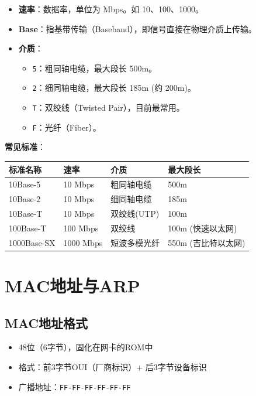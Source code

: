 \begin{itemize}[leftmargin=2em,itemsep=0pt]
    \item \textbf{速率}：数据率，单位为 Mbps。如 10、100、1000。
    \item \textbf{Base}：指基带传输（Baseband），即信号直接在物理介质上传输。
    \item \textbf{介质}：
    \begin{itemize}[itemsep=0pt]
        \item \texttt{5}：粗同轴电缆，最大段长 500m。
        \item \texttt{2}：细同轴电缆，最大段长 185m (约 200m)。
        \item \texttt{T}：双绞线（Twisted Pair），目前最常用。
        \item \texttt{F}：光纤（Fiber）。
    \end{itemize}
\end{itemize}

\textbf{常见标准}：
\begin{table}[htbp]
\centering\small
\begin{tabular}{llll}
\toprule
\textbf{标准名称} & \textbf{速率} & \textbf{介质} & \textbf{最大段长} \\
\midrule
10Base-5 & 10 Mbps & 粗同轴电缆 & 500m \\
10Base-2 & 10 Mbps & 细同轴电缆 & 185m \\
10Base-T & 10 Mbps & 双绞线(UTP) & 100m \\
100Base-T & 100 Mbps & 双绞线 & 100m (快速以太网) \\
1000Base-SX & 1000 Mbps & 短波多模光纤 & 550m (吉比特以太网) \\
\bottomrule
\end{tabular}
\end{table}

\section{MAC地址与ARP}
\subsection{MAC地址格式}
\begin{itemize}[leftmargin=2em,itemsep=0pt]
    \item 48位（6字节），固化在网卡的ROM中
    \item 格式：前3字节OUI（厂商标识）+ 后3字节设备标识
    \item 广播地址：\texttt{FF-FF-FF-FF-FF-FF}
\end{itemize}

